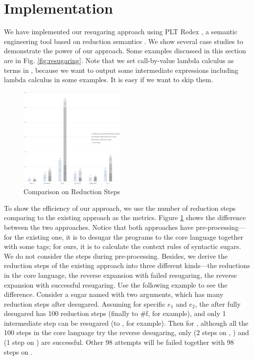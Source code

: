 \section{Implementation}
\label{sec4}


We have implemented our resugaring approach using PLT Redex \cite{SEwPR}, a semantic engineering tool based on reduction semantics \cite{reduction}. We show several case studies to demonstrate the power of our approach. Some examples discussed in this section are in Fig. \ref{fig:resugaring}. Note that we set call-by-value lambda calculus as terms in , because we want to output some intermediate expressions including lambda calculus in some examples. It is easy if we want to skip them.

\begin{figure}[t]
	\centering
	\includegraphics[width=0.47\textwidth]{images/efficiency.png}
	\caption{Comparison on Reduction Steps}
	\label{fig:step}
\end{figure}

To show the efficiency of our approach, we use the number of reduction steps comparing to the existing approach as the metrics. Figure \ref{fig:step} shows the difference between the two approaches. Notice that both approaches have pre-processing---for the existing one, it is to desugar the programs to the core language together with some tags; for ours, it is to calculate the context rules of syntactic sugars. We do not consider the steps during pre-processing. Besides, we derive the reduction steps of the existing approach into three different kinds---the reductions in the core language, the reverse expansion with failed resugaring, the reverse expansion with successful resugaring.  Use the following example to see the difference. Consider a sugar named  with two arguments, which has many reduction steps after desugared. Assuming for specific $e_1$ and $e_2$, the  after fully desugared has 100 reduction steps (finally to \#f, for example), and only 1 intermediate step can be resugared (to , for example). Then for , although all the 100 steps in the core language try the reverse desugaring, only  (2 steps on , ) and  (1 step on ) are successful. Other 98 attempts will be failed together with 98 steps on .

